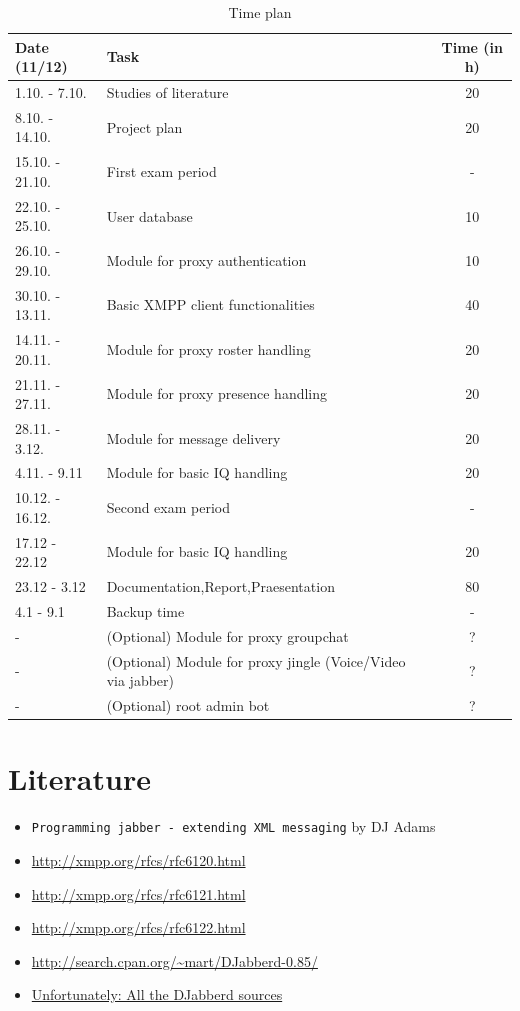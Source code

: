 \documentclass[a4paper,10pt,numbers=noendperiod]{scrartcl}
\begin{document}
\begin{table}[h]
	\centering
	\begin{tabularx}{\textwidth}{|l|X|c|}
	\hline
	\textbf{Date (11/12)} & \textbf{Task} & \textbf{Time (in h)} \\
	\hline
	\hline
	 1.10. - 7.10. & Studies of literature & 20 \\
	\hline
         8.10. - 14.10. & Project plan & 20 \\
	\hline
	15.10. - 21.10. & First exam period & - \\
        \hline
	22.10. - 25.10. & User database & 10 \\
	\hline
	26.10. - 29.10. & Module for proxy authentication & 10 \\
	\hline
	30.10. - 13.11. & Basic XMPP client functionalities  & 40 \\ 
	\hline
	14.11. - 20.11. & Module for proxy roster handling & 20 \\ 
	\hline
	21.11. - 27.11. & Module for proxy presence handling & 20 \\ 
	\hline
	28.11. -  3.12. & Module for message delivery & 20 \\
	\hline
	 4.11. -  9.11  & Module for basic IQ handling & 20 \\
	\hline
	10.12. - 16.12. & Second exam period & - \\
	\hline
	17.12  - 22.12  & Module for basic IQ handling & 20 \\ 
	\hline
	23.12  -  3.12  & Documentation,Report,Praesentation & 80 \\ 
	\hline
	  4.1  -   9.1  & Backup time & - \\
	\hline
	       -        & (Optional) Module for proxy groupchat & ? \\
	\hline
	       -        & (Optional) Module for proxy jingle (Voice/Video via jabber)  & ? \\
	\hline
	       -        & (Optional) root admin bot                                    & ? \\ 
	\hline
	\end{tabularx}
	\caption{Time plan}
	\label{tab:estimatedtime}
\end{table}


\section{Literature}
\begin{itemize}
	\item \texttt{Programming jabber - extending XML messaging} by DJ Adams\\
	\item \url{http://xmpp.org/rfcs/rfc6120.html}\\
	\item \url{http://xmpp.org/rfcs/rfc6121.html}\\
	\item \url{http://xmpp.org/rfcs/rfc6122.html}\\
	\item \url{http://search.cpan.org/~mart/DJabberd-0.85/}\\
	\item \url{Unfortunately: All the DJabberd sources}
\end{itemize}
\end{document}

